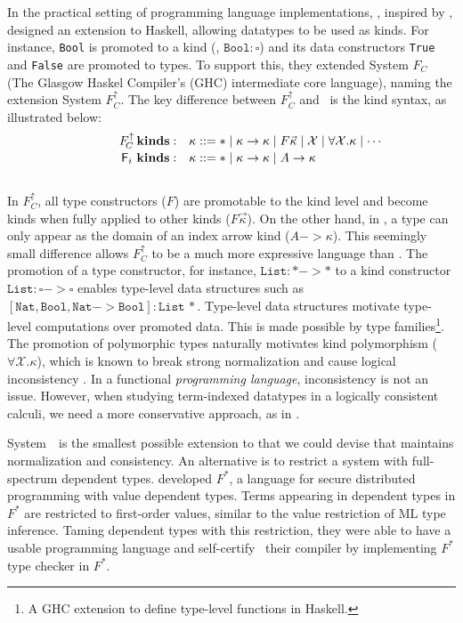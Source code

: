 In the practical setting of programming language implementations,
\citet{YorgeyWCJVM12}, inspired by \citet{SHE}, designed an extension
to Haskell, allowing datatypes to be used as kinds. For instance, \texttt{Bool}
is promoted to a kind (\ie, $\texttt{Bool}:\square$) and its data constructors
\texttt{True} and \texttt{False} are promoted to types. To support this,
they extended System $F_{\!C}$ (The Glasgow Haskel Compiler's (GHC) intermediate core language), 
naming the extension System $F_{\!C}^\uparrow$.
The key difference between $F_{\!C}^\uparrow$ and \Fi\ is the kind syntax, as illustrated below: \vspace*{-2pt}
\[\qquad\quad
\begin{array}{ll}
F_{\!C}^\uparrow\,\textbf{kinds}: &
\kappa ::= * \mid \kappa -> \kappa \mid F \vec{\kappa} \mid \mathcal{X} \mid \forall \mathcal{X}.\kappa \mid \cdots \\
\,\Fi\,\,\textbf{kinds}: &
\kappa ::= * \mid \kappa -> \kappa \mid A -> \kappa \phantom{A^{A^A}}
\end{array}  
\] ~\vspace*{-6pt}\\
In $F_{\!C}^\uparrow$, all type constructors ($F$) are promotable to the 
kind level and become kinds when fully applied to other kinds
($F\vec\kappa$). On the other hand, in \Fi,  a type can only appear
as the domain of an index arrow kind ($A-> \kappa$). This seemingly small
difference allows $F_{\!C}^\uparrow$ to be a much
more expressive language than \Fi. The promotion of
a type constructor, for instance, $\texttt{List}:* -> *$ to a kind constructor
$\texttt{List}:\square-> \square$ enables type-level data structures
such as $\mathtt{[Nat,Bool,Nat-> Bool]:List\,*}$. Type-level
data structures motivate type-level computations over promoted data.
This is made possible by type families\footnote{
	A GHC extension to define type-level functions in Haskell.}.
The promotion of polymorphic types naturally motivates
kind polymorphism ($\forall \mathcal{X}.\kappa$), which is known to
break strong normalization and cause logical inconsistency \cite{Girard72}.
In a functional {\em programming language},
inconsistency is not an issue. However, when studying
term-indexed datatypes in a logically consistent calculi, we need
a more conservative approach, as in \Fi.

System~\Fi\ is the smallest possible
extension to \Fw that we could devise that maintains normalization and consistency.
An alternative is to restrict a system with full-spectrum dependent types.
\citet{Swamy11} developed $F^{*}$,
a language for secure distributed programming with value dependent types.
Terms appearing in dependent types in $F^{*}$ are restricted to first-order %
values, similar to the value restriction of ML type inference. 
Taming dependent types with this restriction, they were able to have a usable programming language
and self-certify~\cite{Strub12} their compiler by implementing $F^{*}$
type checker in $F^{*}$.

